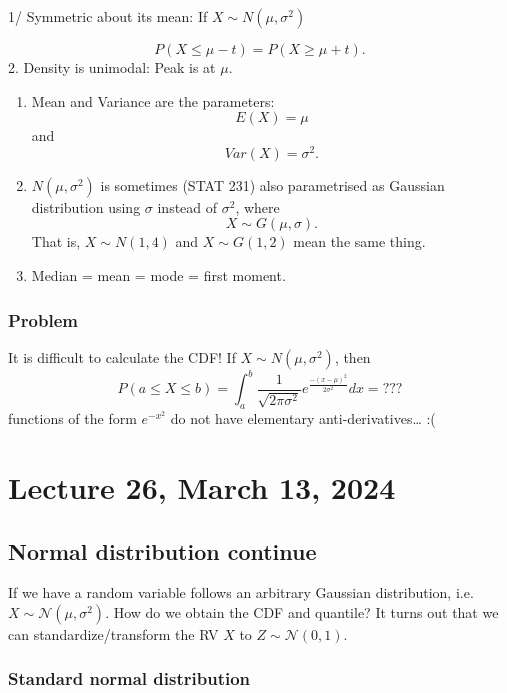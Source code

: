 \documentclass[
]{book}
\theoremstyle{definition}
\theoremstyle{definition}
\theoremstyle{definition}
\theoremstyle{definition}
\theoremstyle{remark}
\begin{document}
1/ Symmetric about its mean: If \(X \sim N(\mu, \sigma^2)\)

\[
P( X \le \mu - t) = P(X \ge \mu + t).
\]
2. Density is unimodal: Peak is at \(\mu\).

\begin{enumerate}
\def\labelenumi{\arabic{enumi}.}
\setcounter{enumi}{2}
\item
  Mean and Variance are the parameters:
  \[E(X)= \mu\]
  and
  \[Var(X)=\sigma^2.\]
\item
  \(N(\mu, \sigma^2)\) is sometimes (STAT 231) also parametrised as Gaussian distribution using \(\sigma\) instead of \(\sigma^2\), where
  \[
  X \sim G(\mu, \sigma).
  \]
  That is, \(X\sim N(1, 4)\) and \(X\sim G(1, 2)\) mean the same thing.
\item
  Median = mean = mode = first moment.
\end{enumerate}

\subsection{Problem}\label{problem}

It is difficult to calculate the CDF! If \(X\sim N(\mu, \sigma^2)\), then
\[
P(a \le X \le b ) = \int_a^b \frac{1}{\sqrt{2\pi \sigma^2}} e^{\frac{-(x-\mu)^2}{2\sigma^2}} dx = ???
\]
functions of the form \(e^{-x^2}\) do not have elementary anti-derivatives\ldots{} :(

\chapter{Lecture 26, March 13, 2024}\label{lecture-26-march-13-2024}

\newcommand{\var}{\mathbb{V}ar}
\newcommand{\R}{\mathbb{R}}
\newcommand{\E}{\mathbb{E}}
\newcommand{\N}{\mathcal{N}}

\section{Normal distribution continue}\label{normal-distribution-continue}

If we have a random variable follows an arbitrary Gaussian distribution, i.e.~\(X\sim \mathcal{N}(\mu,\sigma^2)\). How do we obtain the CDF and quantile? It turns out that we can standardize/transform the RV \(X\) to \(Z\sim\mathcal{N}(0,1)\).

\subsection{Standard normal distribution}\label{standard-normal-distribution}
\end{document}
